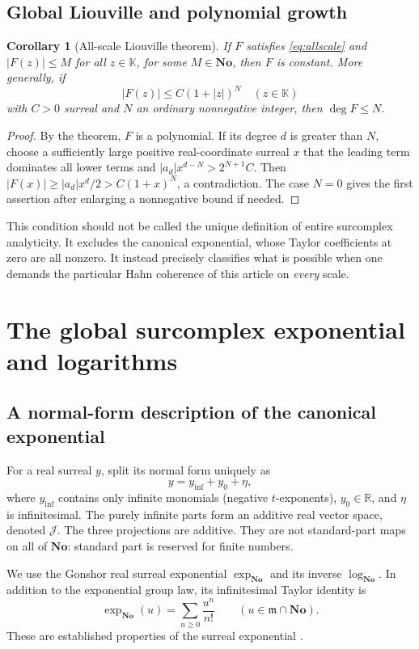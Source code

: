 \documentclass[11pt,oneside]{article}
\numberwithin{equation}{section}
\newtheorem{corollary}[theorem]{Corollary}
\theoremstyle{definition}
\theoremstyle{remark}\newtheorem{remark}[theorem]{Remark}
\newcommand{\No}{\mathbf{No}}
\newcommand{\K}{\mathbb K}
\newcommand{\R}{\mathbb R}
\newcommand{\m}{\mathfrak m}
\begin{document}
\subsection{Global Liouville and polynomial growth}
\begin{corollary}[All-scale Liouville theorem]\label{cor:globalLiouville}
If $F$ satisfies \eqref{eq:allscale} and $|F(z)|\leq M$ for all
$z\in\K$, for some $M\in\No$, then $F$ is constant.
More generally, if
\[
 |F(z)|\leq C(1+|z|)^N\quad(z\in\K)
\]
with $C>0$ surreal and $N$ an ordinary nonnegative integer, then
$\deg F\leq N$.
\end{corollary}
\begin{proof}
By the theorem, $F$ is a polynomial. If its degree $d$ is greater than
$N$, choose a sufficiently large positive real-coordinate surreal $x$
that the leading term dominates all lower terms and
$|a_d|x^{d-N}>2^{N+1}C$. Then
$|F(x)|\geq |a_d|x^d/2>C(1+x)^N$, a contradiction. The case $N=0$
gives the first assertion after enlarging a nonnegative bound if needed.
\end{proof}
This condition should not be called the unique definition of entire
surcomplex analyticity. It excludes the canonical exponential, whose
Taylor coefficients at zero are all nonzero. It instead precisely
classifies what is possible when one demands the particular Hahn
coherence of this article on \emph{every} scale.

\section{The global surcomplex exponential and logarithms}\label{sec:exponential}
\subsection{A normal-form description of the canonical exponential}
For a real surreal $y$, split its normal form uniquely as
\[
 y=y_{\mathrm{inf}}+y_0+\eta,
\]
where $y_{\mathrm{inf}}$ contains only infinite monomials (negative
$t$-exponents), $y_0\in\R$, and $\eta$ is infinitesimal. The purely
infinite parts form an additive real vector space, denoted $\mathcal J$.
The three projections are additive. They are not standard-part maps on
all of $\No$: standard part is reserved for finite numbers.

We use the Gonshor real surreal exponential $\exp_{\No}$ and its inverse
$\log_{\No}$. In addition to the exponential group law, its infinitesimal
Taylor identity is
\[
 \exp_{\No}(u)=\sum_{n\geq0}\frac{u^n}{n!}\qquad(u\in\m\cap\No).
\]
These are established properties of the surreal exponential
\cite{Gonshor,vdDE}.
\end{document}
